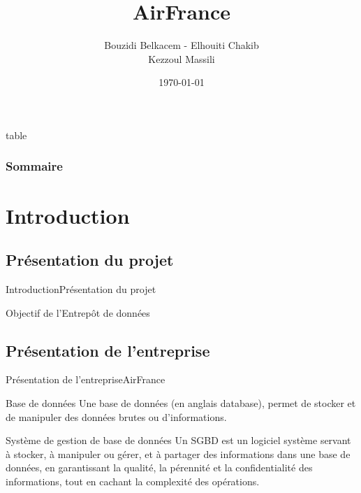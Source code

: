 \documentclass[10pt,handout]{beamer}
\title[Mini-Projet Entrepôt de données]{AirFrance}
\author[Bouzidi, Elhouiti, Kezzoul]{Bouzidi Belkacem - Elhouiti Chakib \\ Kezzoul Massili}
\institute[]{Université de Montpellier}
\date{\today}
\newif\ifplacelogo %
\begin{document}
\placelogofalse
\begin{frame}
	\titlepage
\end{frame}

\placelogotrue


\begin{frame}{table}
	\frametitle{Sommaire}
	\tableofcontents
\end{frame}

\section{Introduction}

\subsection{Présentation du projet}

\begin{frame}{Introduction}{Présentation du projet}

\end{frame}

\placelogofalse
\begin{frame}{Objectif de l'Entrepôt de données}
  
\end{frame}
\placelogotrue

\subsection{Présentation de l'entreprise}
\begin{frame}{Présentation de l'entreprise}{AirFrance}
  \begin{block}{Base de données}
    Une base de données (en anglais database), permet de stocker et de manipuler des données brutes ou d'informations.
  \end{block}

  \begin{block}{Système de gestion de base de données}
    Un SGBD est un logiciel système servant à stocker, à manipuler ou gérer, et à partager des informations dans une base de données, en garantissant la qualité, la pérennité et la confidentialité des informations, tout en cachant la complexité des opérations.
  \end{block}

\end{frame}
\end{document}
